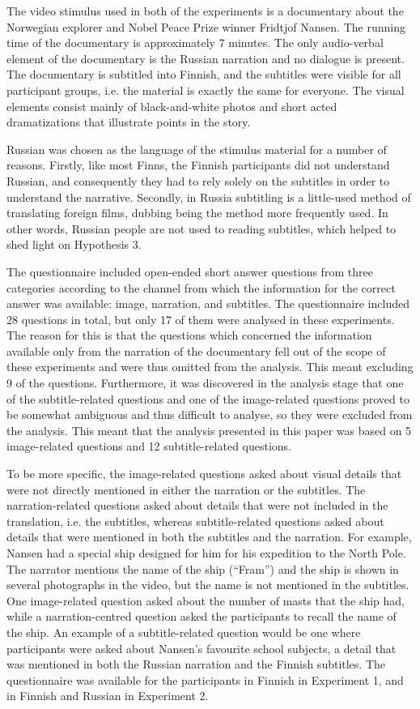 \documentclass[output=paper]{langsci/langscibook}
\begin{document}
The video stimulus used in both of the experiments is a documentary about the Norwegian explorer and Nobel Peace Prize winner Fridtjof Nansen. The running time of the documentary is approximately 7 minutes. The only audio-verbal element of the documentary is the Russian narration and no dialogue is present. The documentary is subtitled into Finnish, and the subtitles were visible for all participant groups, i.e. the material is exactly the same for everyone. The visual elements consist mainly of black-and-white photos and short acted dramatizations that illustrate points in the story. 

Russian was chosen as the language of the stimulus material for a number of reasons. Firstly, like most Finns, the Finnish participants did not understand Russian, and consequently they had to rely solely on the subtitles in order to understand the narrative. Secondly, in Russia subtitling is a little-used method of translating foreign films, dubbing being the method more frequently used. In other words, Russian people are not used to reading subtitles, which helped to shed light on Hypothesis 3. 

The questionnaire included open-ended short answer questions from three categories according to the channel from which the information for the correct answer was available: image, narration, and subtitles. The questionnaire included 28 questions in total, but only 17 of them were analysed in these experiments. The reason for this is that the questions which concerned the information available only from the narration of the documentary fell out of the scope of these experiments and were thus omitted from the analysis. This meant excluding 9 of the questions. Furthermore, it was discovered in the analysis stage that one of the subtitle-related questions and one of the image-related questions proved to be somewhat ambiguous and thus difficult to analyse, so they were excluded from the analysis. This meant that the analysis presented in this paper was based on 5 image-related questions and 12 subtitle-related questions. 

To be more specific, the image-related questions asked about visual details that were not directly mentioned in either the narration or the subtitles. The narration-related questions asked about details that were not included in the translation, i.e. the subtitles, whereas subtitle-related questions asked about details that were mentioned in both the subtitles and the narration. For example, Nansen had a special ship designed for him for his expedition to the North Pole. The narrator mentions the name of the ship (``Fram'') and the ship is shown in several photographs in the video, but the name is not mentioned in the subtitles. One image-related question asked about the number of masts that the ship had, while a narration-centred question asked the participants to recall the name of the ship. An example of a subtitle-related question would be one where participants were asked about Nansen's favourite school subjects, a detail that was mentioned in both the Russian narration and the Finnish subtitles. The questionnaire was available for the participants in Finnish in Experiment 1, and in Finnish and Russian in Experiment 2.
\end{document}
